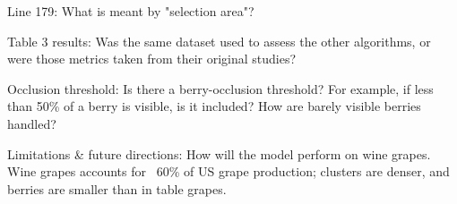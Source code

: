 \documentclass{ar2rc}
\begin{document}


\begin{reviewercomment}
    Line 179: What is meant by "selection area"?
\end{reviewercomment}




\begin{reviewercomment}
    Table 3 results: Was the same dataset used to assess the other algorithms, or were those metrics taken from their original studies?
\end{reviewercomment}




\begin{reviewercomment}
    Occlusion  threshold: Is there a berry-occlusion threshold? For example, if less  than 50\% of a berry is visible, is it included? How are barely visible  berries handled?
\end{reviewercomment}




\begin{reviewercomment}
    Limitations \& future directions: How will the  model perform on wine grapes. Wine grapes accounts for ~60\% of US grape  production; clusters are denser, and berries are smaller than in table grapes.
\end{reviewercomment}





\phantom{\cite{}} %

\renewcommand{\bibsection}{} %

\end{document}
